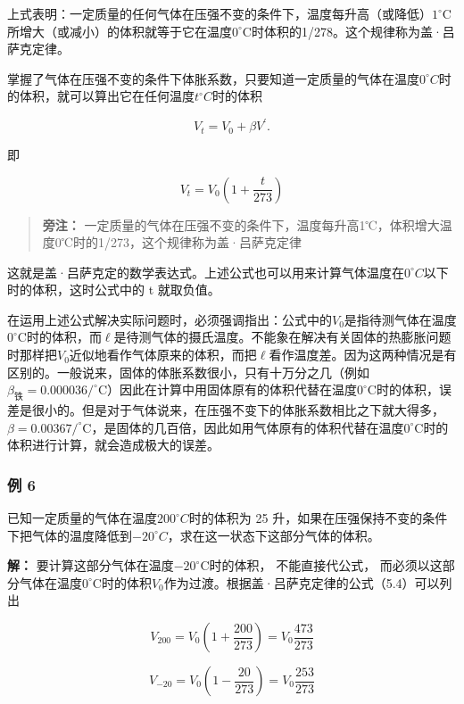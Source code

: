 上式表明：一定质量的任何气体在压强不变的条件下，温度每升高（或降低）\(1^{\circ}\)C所增大（或减小）的体积就等于它在温度\(0^{\circ}\)C时体积的1/278。这个规律称为盖·吕萨克定律。

掌握了气体在压强不变的条件下体胀系数，只要知道一定质量的气体在温度\(0^{\circ}C\)时的体积，就可以算出它在任何温度\(t^{\circ}C\)时的体积

\[
V _ {t} = V _ {0} + \beta V ^ {\prime}.
\]

即

\[
V _ {t} = V _ {0} \left(1 + \frac {t}{273}\right) \tag {5.4}
\]

\begin{quote}
\textbf{旁注：}
一定质量的气体在压强不变的条件下，温度每升高1℃，体积增大温度0℃时的1/273，这个规律称为盖·吕萨克定律
\end{quote}

这就是盖·吕萨克定的数学表达式。上述公式也可以用来计算气体温度在\(0^{\circ}C\)以下时的体积，这时公式中的
t 就取负值。

在运用上述公式解决实际问题时，必须强调指出：公式中的\(V_{0}\)是指待测气体在温度\(0^{\circ}\mathrm{C}\)时的体积，而\(\ell\)是待测气体的摄氏温度。不能象在解决有关固体的热膨胀问题时那样把\(V_{0}\)近似地看作气体原来的体积，而把\(\ell\)看作温度差。因为这两种情况是有区别的。一般说来，固体的体胀系数很小，只有十万分之几（例如\(\beta_{\text{铁}} = 0.000036 / ^{\circ}\mathrm{C}\)）因此在计算中用固体原有的体积代替在温度\(0^{\circ}\mathrm{C}\)时的体积，误差是很小的。但是对于气体说来，在压强不变下的体胀系数相比之下就大得多，\(\beta = 0.00367 / ^{\circ}\mathrm{C}\)，是固体的几百倍，因此如用气体原有的体积代替在温度\(0^{\circ}\mathrm{C}\)时的体积进行计算，就会造成极大的误差。

\subsubsection{例 6}\label{ux4f8b-6-2}

已知一定质量的气体在温度\(200^{\circ}C\)时的体积为 25
升，如果在压强保持不变的条件下把气体的温度降低到\(-20^{\circ}C\)，求在这一状态下这部分气体的体积。

\textbf{解：} 要计算这部分气体在温度\(-20^{\circ}\mathrm{C}\)时的体积，
不能直接代公式，
而必须以这部分气体在温度\(0^{\circ}\mathrm{C}\)时的体积\(V_{0}\)作为过渡。根据盖·吕萨克定律的公式（5.4）可以列出

\[
V _ {200} = V _ {0} \left(1 + \frac {200}{273}\right) = V _ {0} \frac {473}{273}
\]

\[
V_{-20}=V_0\left(1-\frac{20}{273}\right)=V_0\frac{253}{273}
\]

